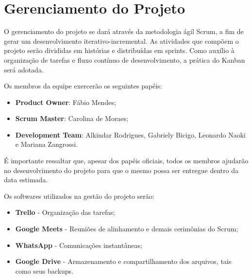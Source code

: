\chapter{Gerenciamento do Projeto}
O gerenciamento do projeto se dará através da metodologia ágil Scrum, a fim de gerar um desenvolvimento iterativo-incremental. As atividades que compõem o projeto serão divididas em histórias e distribuídas em sprints.
Como auxílio à organização de tarefas e fluxo contínuo de desenvolvimento, a prática do Kanban será adotada. 

Os membros da equipe exercerão os seguintes papéis:

\begin {itemize}
\item \textbf{Product Owner}: Fábio Mendes;
\item \textbf{Scrum Master}: Carolina de Moraes;
\item \textbf{Development Team}: Alkindar Rodrigues, Gabriely Bicigo, Leonardo Naoki e Mariana Zangrossi.
\end {itemize}

É importante ressaltar que, apesar dos papéis oficiais, todos os membros ajudarão no desenvolvimento do projeto para que o mesmo possa ser entregue dentro da data estimada. 


Os softwares utilizados na gestão do projeto serão:

\begin {itemize}
\item \textbf{Trello} - Organização das tarefas;
\item \textbf{Google Meets} - Reuniões de alinhamento e demais cerimônias do Scrum;
\item \textbf{WhatsApp} - Comunicações instantâneas;
\item \textbf{Google Drive} - Armazenamento e compartilhamento dos arquivos, tais como seus backups.
\end {itemize}

